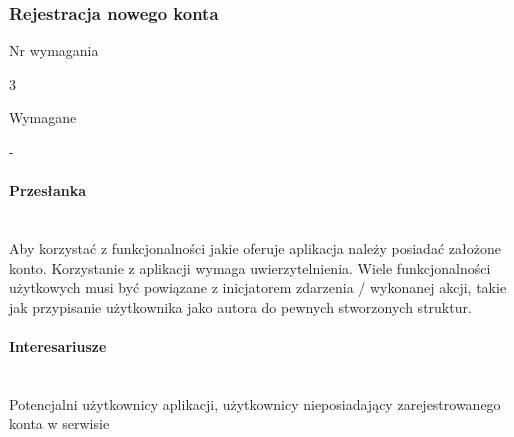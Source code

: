 \documentclass[eng,printmode]{mgr}
\begin{document}
\subsubsection{Rejestracja nowego konta}
\begin{labeling}{Nr wymagania}
\item [Nr wymagania:] 3
\item [Typ:] Wymagane
\item [Powiązania:] -
\end{labeling}

\paragraph{Przesłanka}\ \\
Aby korzystać z funkcjonalności jakie oferuje aplikacja należy posiadać założone konto. Korzystanie z aplikacji wymaga uwierzytelnienia. Wiele funkcjonalności użytkowych musi być powiązane z inicjatorem zdarzenia / wykonanej akcji, takie jak przypisanie użytkownika jako autora do pewnych stworzonych struktur.

\paragraph{Interesariusze}\ \\
Potencjalni użytkownicy aplikacji, użytkownicy nieposiadający zarejestrowanego konta w serwisie
\end{document}
